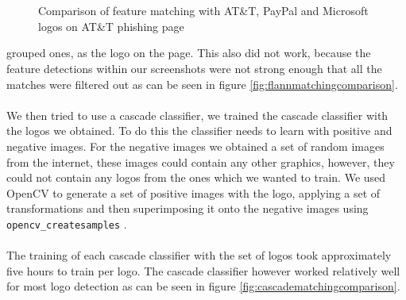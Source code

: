 \documentclass[12pt,twoside]{report}
\begin{document}
\begin{figure}[!h]
\begin{center}
      \\\\
    \endminipage
\end{center}
\caption{Comparison of feature matching with AT\&T, PayPal and Microsoft logos on AT\&T phishing page}\label{fig:featurematchingcomparison}
\end{figure}
\restoregeometry
\noindent
grouped ones, as the logo on the page. This also did not work, because the feature detections within our screenshots were not strong enough that all the matches were filtered out as can be seen in figure \ref{fig:flannmatchingcomparison}.
\\\\
We then tried to use a cascade classifier, we trained the cascade classifier with the logos we obtained. To do this the classifier needs to learn with positive and negative images. For the negative images we obtained a set of random images from the internet, these images could contain any other graphics, however, they could not contain any logos from the ones which we wanted to train. We used OpenCV to generate a set of positive images with the logo, applying a set of transformations and then superimposing it onto the negative images using \texttt{opencv\_createsamples} \cite{opencv}.
\\\\
The training of each cascade classifier with the set of logos took approximately five hours to train per logo. The cascade classifier however worked relatively well for most logo detection as can be seen in figure \ref{fig:cascadematchingcomparison}.
\end{document}
